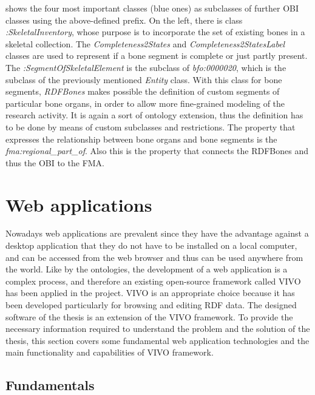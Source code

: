  shows the four most important classes (blue ones) as subclasses of further OBI classes using the above-defined prefix. On the left, there is class \textit{:SkeletalInventory}, whose purpose is to incorporate the set of existing bones in a skeletal collection. The \textit{Completeness2States} and \textit{Completeness2StatesLabel} classes are used to represent if a bone segment is complete or just partly present. The \textit{:SegmentOfSkeletalElement} is the subclass of \textit{bfo:0000020}, which is the subclass of the previously mentioned \textit{Entity} class. With this class for bone segments, \textit{RDFBones} makes possible the definition of custom segments of particular bone organs, in order to allow more fine-grained modeling of the research activity. It is again a sort of ontology extension, thus the definition has to be done by means of custom subclasses and restrictions. The property that expresses the relationship between bone organs and bone segments is the \textit{fma:regional\_part\_of}. Also this is the property that connects the RDFBones and thus the OBI to the FMA.


\section{Web applications}

Nowadays web applications are prevalent since they have the advantage against a desktop application that they do not have to be installed on a local computer, and can be accessed from the web browser and thus can be used anywhere from the world. Like by the ontologies, the development of a web application is a complex process, and therefore an existing open-source framework called VIVO has been applied in the project. VIVO is an appropriate choice because it has been developed particularly for browsing and editing RDF data.  The designed software of the thesis is an extension of the VIVO framework. To provide the necessary information required to understand the problem and the solution of the thesis, this section covers some fundamental web application technologies and the main functionality and capabilities of VIVO framework.

\subsection{Fundamentals} \label{fundamentals}

